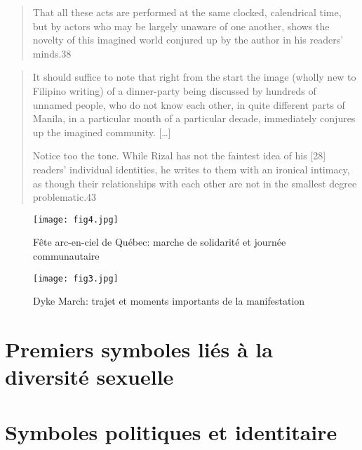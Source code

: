 \begin{quote}
  That all these acts are performed at the same clocked, calendrical time, but   by actors who may be largely unaware of one another, shows the novelty of this imagined world conjured up by the author in his readers' minds.38
  \citep{Anderson1983}
\end{quote}

\begin{quote}
	
It should suffice to note that right from the start the image (wholly new to Filipino writing) of a dinner-party being discussed by hundreds of unnamed people, who do not know each other, in quite different parts of Manila, in a particular month of a particular decade, immediately conjures up the imagined community.
[\ldots]

Notice too the tone. 
While Rizal has not the faintest idea of his [28] readers' individual identities, he writes to them with an ironical intimacy, as though their relationships with each other are not in the smallest degree problematic.43
\end{quote}


\begin{figure}[ht]
	\centering
	\texttt{[image: fig4.jpg]}
	\caption{Fête arc-en-ciel de Québec: marche de solidarité et journée
    communautaire}
	\label{fig:figure4}
\end{figure}

\begin{figure}[ht]
	\centering
	\texttt{[image: fig3.jpg]}
	\caption[]{Dyke March: trajet et moments importants de la manifestation}
	\label{fig:figure3}
\end{figure}


\section{Premiers symboles liés à la diversité sexuelle}
\label{sec:premiers_symboles_li_s_la_diversit_sexuelle}


\section{Symboles politiques et identitaire}
\label{sec:symboles_politiques_et_identitaire}

